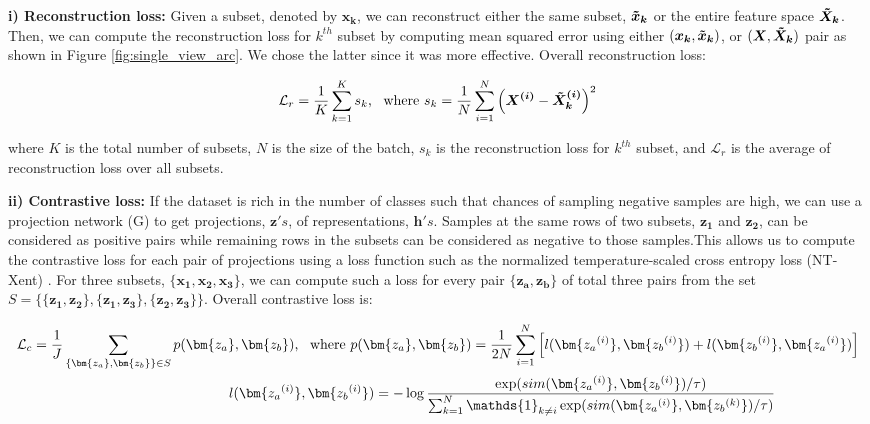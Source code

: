 \textbf{i) Reconstruction loss:} Given a subset, denoted by $\boldsymbol{x_k}$, we can reconstruct either the same subset, $\boldsymbol{\Tilde{x}_k}$ or the entire feature space $\boldsymbol{\Tilde{X}_k}$. 
Then, we can compute the reconstruction loss for $k^{th}$ subset by computing mean squared error using either  $(\boldsymbol{x_k}, \boldsymbol{\Tilde{x}_k})$, or $(\boldsymbol{X},\boldsymbol{\Tilde{X}_k})$ pair as shown in Figure \ref{fig:single_view_arc}. We chose the latter since it was more effective. Overall reconstruction loss:

\begin{equation} \label{eq2}
\mathcal{L}_r = \frac{1}{K}\sum_{k=1}^{K} s_k \mbox{, \, where } s_k = \frac{1}{N}\sum_{i=1}^{N} \left( \boldsymbol{X^{(i)}}-\boldsymbol{{\Tilde{X}_k}^{(i)}}\right)^2
\end{equation}

where $K$ is the total number of subsets, $N$ is the size of the batch, $s_k$ is the reconstruction loss for $k^{th}$ subset, and $\mathcal{L}_r$ is the average of reconstruction loss over all subsets. 

\textbf{ii) Contrastive loss:} If the dataset is rich in the number of classes such that chances of sampling negative samples are high, we can use a projection network (G) to get projections, $\boldsymbol{z}'s$, of representations, $\boldsymbol{h}'s$. Samples at the same rows of two subsets, $\boldsymbol{z_1}$ and $\boldsymbol{z_2}$, can be considered as positive pairs while remaining rows in the subsets can be considered as negative to those samples.This allows us to compute the contrastive loss for each pair of projections using a loss function such as the normalized temperature-scaled cross entropy loss (NT-Xent) \citep{chen2020simple}. For three subsets, $\{\bm{x_1}, \bm{x_2}, \bm{x_3}\}$, we can compute such a loss for every pair $\{\bm{z_a}, \bm{z_b}\}$ of total three pairs from the set $S=\{\{\bm{z_1, z_2}\},\{\bm{z_1, z_3}\},\{\bm{z_2, z_3}\}\}$. Overall contrastive loss is:

\begin{eqnarray}
\mathcal{L}_c = \frac{1}{J}\sum_{\{\bm{z_a},\bm{z_b}\}\in S} p(\bm{z_a},\bm{z_b})\mbox{, \, where }  p(\bm{z_a},\bm{z_b})=\frac{1}{2N}\sum_{i=1}^{N}\left[ l(\bm{{z_a}^{(i)}}, \bm{{z_b}^{(i)}}) + l(\bm{{z_b}^{(i)}}, \bm{{z_a}^{(i)}})\right] \label{eq3}\\
l(\bm{{z_a}^{(i)}}, \bm{{z_b}^{(i)}}) = -\log\frac{\exp(sim(\bm{{z_a}^{(i)}},\bm{{z_b}^{(i)}})/\tau)}{\sum_{k=1}^{N} \mathds{1}_{k \neq i} \exp(sim(\bm{{z_a}^{(i)}}, \bm{{z_b}^{(k)}})/\tau)} \qquad \qquad \qquad \label{eq4}
\end{eqnarray}

